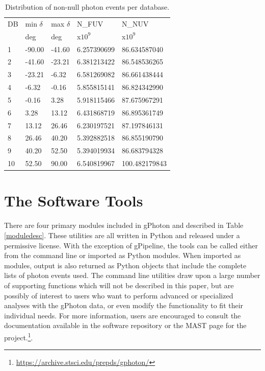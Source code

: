 \documentclass[iop]{emulateapj}
\begin{document}
\begin{table}[h]
\begin{tabularx}{0.45\textwidth}{lllll}
\hline
DB & min $\delta$ & max $\delta$ & N\_FUV & N\_NUV\\
   & deg          & deg          & x$10^9$ & x$10^9$\\
\hline
1 & -90.00 & -41.60 &   6.257390699 &  86.634587040\\
2 & -41.60 & -23.21 &   6.381213422 &  86.548536265\\
3 & -23.21 &  -6.32 &   6.581269082 &  86.661438444\\
4 &  -6.32 &  -0.16 &   5.855815141 &  86.824342990\\
5 &  -0.16 &   3.28 &   5.918115466 &  87.675967291\\
6 &   3.28 &  13.12 &   6.431868719 &  86.895361749\\
7 &  13.12 &  26.46 &   6.230197521 &  87.197846131\\
8 &  26.46 &  40.20 &   5.392882518 &  86.855190790\\
9 &  40.20 &  52.50 &   5.394019934 &  86.683794328\\
10 &  52.50 &  90.00 &   6.540819967 & 100.482179843\\
\hline
\end{tabularx}
\caption{Distribution of non-null photon events per database.\label{dbcounts}}
\end{table}

\section{The Software Tools}
\label{softwaretools}
There are four primary modules included in gPhoton and described in Table \ref{moduledesc}. These utilities are all written in Python and released under a permissive license. With the exception of gPipeline, the tools can be called either from the command line or imported as Python modules. When imported as modules, output is also returned as Python objects that include the complete lists of photon events used. The command line utilities draw upon a large number of supporting functions which will not be described in this paper, but are possibly of interest to users who want to perform advanced or specialized analyses with the gPhoton data, or even modify the functionality to fit their individual needs. For more information, users are encouraged to consult the documentation available in the software repository or the MAST page for the project.\footnote{\url{https://archive.stsci.edu/prepds/gphoton/}}.
\end{document}
